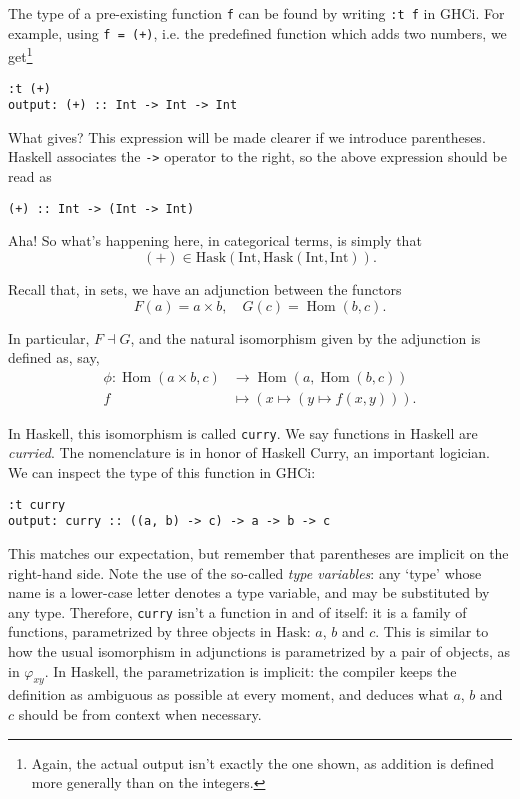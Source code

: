 \documentclass[11	pt]{article}
\theoremstyle{nonumberplain}
\newcommand{\Hask}{\mathrm{Hask}}
\newcommand{\type}[1]{\mathrm{#1}}
\DeclareMathOperator{\Hom}{Hom}
\newcommand*\lsin{\lstinline}
\begin{document}
The type of a pre-existing function \lsin|f| can be found by writing \lsin|:t f| in GHCi. For example, using \lsin|f = (+)|, i.e. the predefined function which adds two numbers, we get\footnote{Again, the actual output isn't exactly the one shown, as addition is defined more generally than on the integers.}
\begin{lstlisting}
:t (+)
output: (+) :: Int -> Int -> Int
\end{lstlisting}

What gives? This expression will be made clearer if we introduce parentheses. Haskell associates the \lsin|->| operator to the right, so the above expression should be read as
\begin{lstlisting}
(+) :: Int -> (Int -> Int)
\end{lstlisting}

Aha! So what's happening here, in categorical terms, is simply that
\begin{equation}
(+) \in \Hask(\type{Int}, \Hask(\type{Int}, \type{Int})).
\end{equation}

Recall that, in sets, we have an adjunction between the functors
\begin{equation}
F(a) = a \times b, \quad G(c) = \Hom(b,c).
\end{equation}

In particular, $F \dashv G$, and the natural isomorphism given by the adjunction is defined as, say,
\begin{equation}
\begin{aligned}
\phi \colon \Hom(a \times b, c) &\to \Hom(a, \Hom(b,c))\\
f &\mapsto (x \mapsto (y \mapsto f(x,y))).
\end{aligned}
\end{equation}

In Haskell, this isomorphism is called \lsin|curry|. We say functions in Haskell are \emph{curried}. The nomenclature is in honor of Haskell Curry, an important logician. We can inspect the type of this function in GHCi:
\begin{lstlisting}
:t curry
output: curry :: ((a, b) -> c) -> a -> b -> c
\end{lstlisting}

This matches our expectation, but remember that parentheses are implicit on the right-hand side. Note the use of the so-called \emph{type variables}: any `type' whose name is a lower-case letter denotes a type variable, and may be substituted by any type. Therefore, \lsin|curry| isn't a function in and of itself: it is a family of functions, parametrized by three objects in $\Hask$: $a$, $b$ and $c$. This is similar to how the usual isomorphism in adjunctions is parametrized by a pair of objects, as in $\varphi_{xy}$. In Haskell, the parametrization is implicit: the compiler keeps the definition as ambiguous as possible at every moment, and deduces what $a$, $b$ and $c$ should be from context when necessary.
\end{document}
